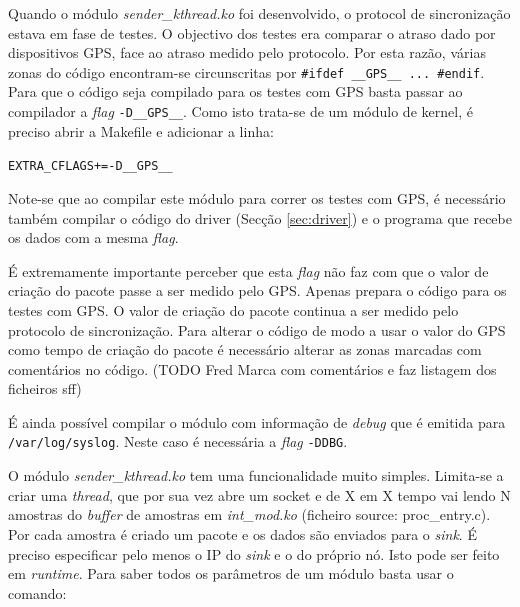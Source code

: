 \documentclass[10pt,a4paper,oneside]{book}
\begin{document}
    Quando o módulo \emph{sender\_kthread.ko} foi desenvolvido, o protocol de sincronização estava em fase de testes. O objectivo dos testes era comparar o atraso dado por dispositivos GPS, face ao atraso medido pelo protocolo. Por esta razão, várias zonas do código encontram-se circunscritas por {\tt \#ifdef \_\_GPS\_\_ ... \#endif}. Para que o código seja compilado para os testes com GPS basta passar ao compilador a \emph{flag} {\tt -D\_\_GPS\_\_}. Como isto trata-se de um módulo de kernel, é preciso abrir a Makefile e adicionar a linha:

    \begin{center}
      {\tt EXTRA\_CFLAGS+=-D\_\_GPS\_\_}
    \end{center}

    Note-se que ao compilar este módulo para correr os testes com GPS, é necessário também compilar o código do driver (Secção \ref{sec:driver}) e o programa que recebe os dados com a mesma \emph{flag}.

    É extremamente importante perceber que esta \emph{flag} não faz com que o valor de criação do pacote passe a ser medido pelo GPS. Apenas prepara o código para os testes com GPS. O valor de criação do pacote continua a ser medido pelo protocolo de sincronização. Para alterar o código de modo a usar o valor do GPS como tempo de criação do pacote é necessário alterar as zonas marcadas com comentários no código.
    (TODO Fred Marca com comentários e faz listagem dos ficheiros sff)

    É ainda possível compilar o módulo com informação de \emph{debug} que é emitida para {\tt /var/log/syslog}. Neste caso é necessária a \emph{flag} {\tt -DDBG}.

    O módulo \emph{sender\_kthread.ko} tem uma funcionalidade muito simples. Limita-se a criar uma \emph{thread}, que por sua vez abre um socket e de X em X tempo vai lendo N amostras do \emph{buffer} de amostras em \emph{int\_mod.ko} (ficheiro source: proc\_entry.c). Por cada amostra é criado um pacote e os dados são enviados para o \emph{sink}. É preciso especificar pelo menos o IP do \emph{sink} e o do próprio nó. Isto pode ser feito em \emph{runtime}. Para saber todos os parâmetros de um módulo basta usar o comando:
\end{document}
